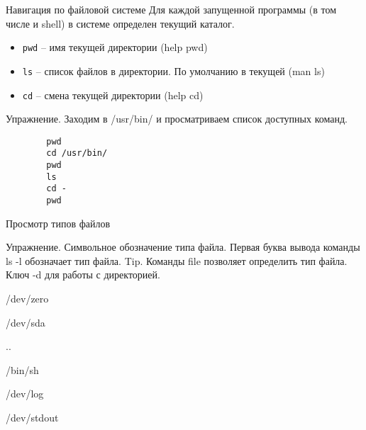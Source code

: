 \begin{frame}[fragile]{Навигация по файловой системе}
 Для каждой запущенной программы (в том числе и shell) в системе определен \alert{текущий каталог}. 
      \begin{itemize}
		  \item {\tt pwd} -- имя текущей директории (help pwd)
		  \item {\tt ls} -- список файлов в директории. По умолчанию в текущей (man ls)
		  \item {\tt cd} -- смена текущей директории (help cd)
      \end{itemize}
      \begin{block}{Упражнение. Заходим в /usr/bin/ и просматриваем список доступных команд.}
	\begin{lstlisting}
        pwd
        cd /usr/bin/
        pwd
        ls
        cd -
        pwd
\end{lstlisting}
      \end{block}
\end{frame}

\begin{frame}[fragile]{Просмотр типов файлов}
      \begin{block}{Упражнение. Символьное обозначение типа файла.}
Первая буква вывода команды ls -l обозначает тип файла. 
Tip. Команды file позволяет определить тип файла. Ключ -d для работы с
директорией. 

/dev/zero

/dev/sda 

.. 

/bin/sh 

/dev/log

/dev/stdout
      \end{block}
\end{frame}

